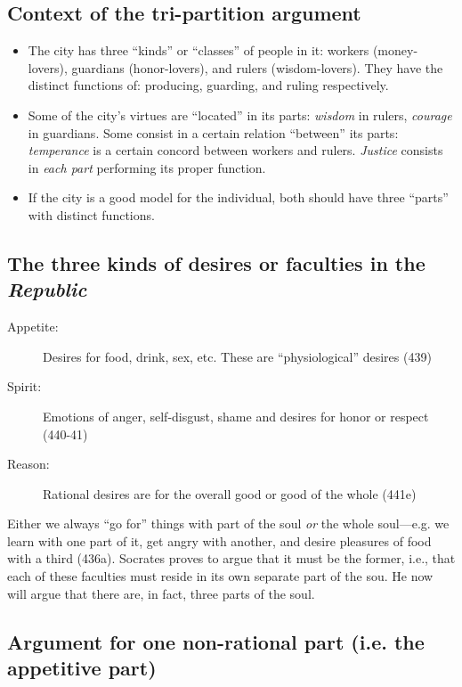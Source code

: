 \documentclass[oneside]{article}
\begin{document}
\thispagestyle{fancy}

\subsection*{Context of the tri-partition argument}

\begin{itemize}
\item The city has three ``kinds'' or ``classes'' of people in it: workers (money-lovers), guardians (honor-lovers), and rulers (wisdom-lovers). They have the distinct functions of: producing, guarding, and ruling respectively.
\item Some of the city's virtues are ``located'' in its parts: \emph{wisdom} in rulers, \emph{courage} in guardians. Some consist in a certain relation ``between'' its parts: \emph{temperance} is a certain concord between workers and rulers. \emph{Justice} consists in \emph{each part }performing its proper function.
\item If the city is a good model for the individual, both should have three ``parts'' with distinct functions.
\end{itemize}

\subsection*{The three kinds of desires or faculties in the \emph{Republic}}

\begin{description}
\item[Appetite:] Desires for food, drink, sex, etc. These are ``physiological'' desires (439)
\item[Spirit:] Emotions of anger, self-disgust, shame and desires for honor or respect (440-41)
\item[Reason:] Rational desires are for the overall good or good of the whole (441e)
\end{description}

\noindent Either we always ``go for'' things with part of the soul \emph{or} the whole soul---e.g. we learn with one part of it, get angry with another, and desire pleasures of food with a third (436a). Socrates proves to argue that it must be the former, i.e., that each of these faculties must reside in its own separate part of the sou. He now will argue that there are, in fact, three parts of the soul. 

\subsection*{Argument for one non-rational part (i.e. the appetitive part)}
\end{document}
